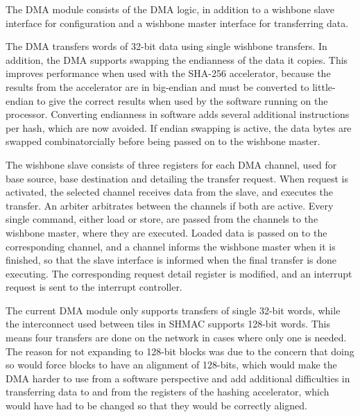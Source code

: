 The DMA module consists of the DMA logic, in addition to a wishbone slave interface for configuration
and a wishbone master interface for transferring data.

The DMA transfers words of 32-bit data using single wishbone transfers.  In addition, the DMA supports
swapping the endianness of the data it copies. This improves performance when used with the SHA-256
accelerator, because the results from the accelerator are in big-endian
and must be converted to little-endian to give the correct results when used by the software running on the processor.
Converting endianness in software adds several additional instructions per hash, which are now avoided.
If endian swapping is active, the data bytes are swapped combinatorcially before being passed on to the wishbone master.

The wishbone slave consists of three registers for each DMA channel, used for base source, base destination and detailing the transfer request.
When request is activated, the selected channel receives data from the slave, and executes the transfer.
An arbiter arbitrates between the channels if both are active.
Every single command, either load or store, are passed from the channels to the wishbone master, where they are executed.
Loaded data is passed on to the corresponding channel, and a channel informs the wishbone master when it is finished, so that the slave interface is informed when the final transfer is done executing.
The corresponding request detail register is modified, and an interrupt request is sent to the interrupt controller.

The current DMA module only supports transfers of single 32-bit words, while the interconnect used between tiles in SHMAC supports 128-bit words.
This means four transfers are done on the network in cases where only one is needed. 
The reason for not expanding to 128-bit blocks was due to the concern that doing so would force blocks to have an alignment of 128-bits, which would make the DMA harder to use from a software perspective and add additional difficulties in transferring data to and from the registers of the hashing accelerator, which would have had to be changed so that they would be correctly aligned.

